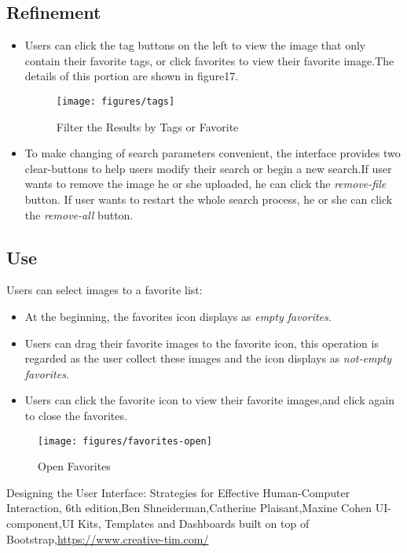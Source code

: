 \documentclass{hci}
\begin{document}
\subsection{Refinement}
\begin{itemize}
	\item Users can click the tag buttons on the left to view the image that only contain their favorite tags, or click favorites to view their favorite image.The details of this portion are shown in figure17.
	\begin{figure}[htbp]
		\centering
		\texttt{[image: figures/tags]}
		\caption{Filter the Results by Tags or Favorite}
		\label{fig:tags}
	\end{figure}
	\item To make changing of search parameters convenient, the interface provides two clear-buttons to help users modify their search or begin a new search.If user wants to remove the image he or she uploaded, he can click the \textit{remove-file} button. If user wants to restart the whole search process, he or she can click the \textit{remove-all} button.	
\end{itemize}

\subsection{Use}
Users can select images to a favorite list:
\begin{itemize}
	\item At the beginning, the favorites icon displays as \textit{empty favorites}.
	\item Users can drag their favorite images to the favorite icon, this operation is regarded as the user collect these images and the icon displays as \textit{not-empty favorites}.
	\item Users can click the favorite icon to view their favorite images,and click again to close the favorites.
\end{itemize}
	\begin{figure}[htbp]
	\centering
	\texttt{[image: figures/favorites-open]}
	\caption{Open Favorites}
	\label{fig:favorite-open}
\end{figure}




\begin{thebibliography}{99}
 Designing the User Interface: Strategies for Effective Human-Computer Interaction, 6th edition,Ben Shneiderman,Catherine Plaisant,Maxine Cohen
 UI-component,UI Kits, Templates and Dashboards built on top of Bootstrap,\url{https://www.creative-tim.com/}
\end{thebibliography}
\end{document}
